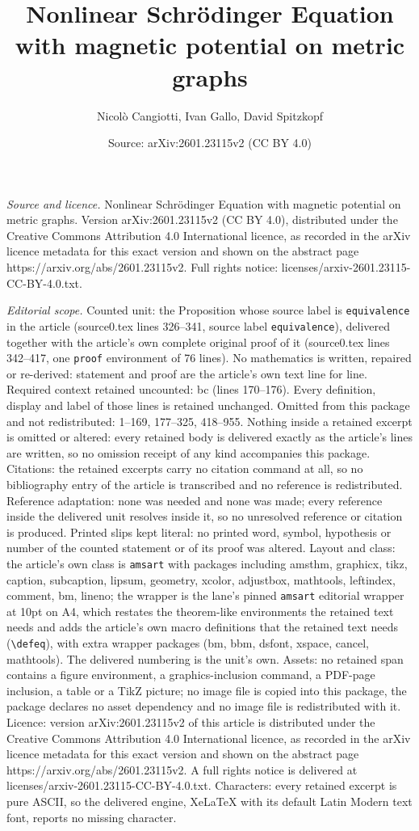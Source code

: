\documentclass[10pt,a4paper]{amsart}
\title[Nonlinear Schr\"odinger Equation with magnetic potential on ]{Nonlinear Schr\"odinger Equation with magnetic potential on metric graphs}
\author{Nicol\`o Cangiotti, Ivan Gallo, David Spitzkopf}
\date{Source: arXiv:2601.23115v2 (CC BY 4.0)}
\begin{document}
\maketitle

\noindent\emph{Source and licence.} Nonlinear Schr\"odinger Equation with magnetic potential on metric graphs. Version arXiv:2601.23115v2 (CC BY 4.0), distributed under the Creative Commons Attribution 4.0 International licence, as recorded in the arXiv licence metadata for this exact version and shown on the abstract page https://arxiv.org/abs/2601.23115v2. Full rights notice: licenses/arxiv-2601.23115-CC-BY-4.0.txt.\par\smallskip

\noindent\textit{Editorial scope.} Counted unit: the Proposition whose source label is \texttt{equivalence} in the article (source0.tex lines 326--341, source label \texttt{equivalence}), delivered together with the article's own complete original proof of it (source0.tex lines 342--417, one \texttt{proof} environment of 76 lines). No mathematics is written, repaired or re-derived: statement and proof are the article's own text line for line. Required context retained uncounted: bc (lines 170--176). Every definition, display and label of those lines is retained unchanged. Omitted from this package and not redistributed: 1--169, 177--325, 418--955. Nothing inside a retained excerpt is omitted or altered: every retained body is delivered exactly as the article's lines are written, so no omission receipt of any kind accompanies this package. Citations: the retained excerpts carry no citation command at all, so no bibliography entry of the article is transcribed and no reference is redistributed. Reference adaptation: none was needed and none was made; every reference inside the delivered unit resolves inside it, so no unresolved reference or citation is produced. Printed slips kept literal: no printed word, symbol, hypothesis or number of the counted statement or of its proof was altered. Layout and class: the article's own class is \texttt{amsart} with packages including amsthm, graphicx, tikz, caption, subcaption, lipsum, geometry, xcolor, adjustbox, mathtools, leftindex, comment, bm, lineno; the wrapper is the lane's pinned \texttt{amsart} editorial wrapper at 10pt on A4, which restates the theorem-like environments the retained text needs and adds the article's own macro definitions that the retained text needs (\texttt{\textbackslash defeq}), with extra wrapper packages (bm, bbm, dsfont, xspace, cancel, mathtools). The delivered numbering is the unit's own. Assets: no retained span contains a figure environment, a graphics-inclusion command, a PDF-page inclusion, a table or a TikZ picture; no image file is copied into this package, the package declares no asset dependency and no image file is redistributed with it. Licence: version arXiv:2601.23115v2 of this article is distributed under the Creative Commons Attribution 4.0 International licence, as recorded in the arXiv licence metadata for this exact version and shown on the abstract page https://arxiv.org/abs/2601.23115v2. A full rights notice is delivered at licenses/arxiv-2601.23115-CC-BY-4.0.txt. Characters: every retained excerpt is pure ASCII, so the delivered engine, XeLaTeX with its default Latin Modern text font, reports no missing character.
\end{document}
